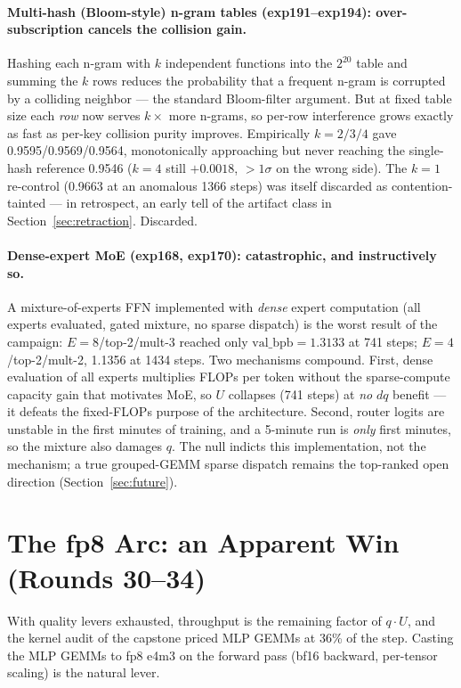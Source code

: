 \documentclass{article}
\newcommand{\valbpb}{\mathrm{val\_bpb}}
\begin{document}
\paragraph{Multi-hash (Bloom-style) n-gram tables (exp191--exp194): over-subscription cancels the collision gain.}
Hashing each n-gram with $k$ independent functions into the $2^{20}$ table and summing the $k$ rows reduces the probability that a frequent n-gram is corrupted by a colliding neighbor --- the standard Bloom-filter argument. But at fixed table size each \emph{row} now serves $k\times$ more n-grams, so per-row interference grows exactly as fast as per-key collision purity improves. Empirically $k=2/3/4$ gave 0.9595/0.9569/0.9564, monotonically approaching but never reaching the single-hash reference 0.9546 ($k=4$ still $+0.0018$, $> 1\sigma$ on the wrong side). The $k=1$ re-control (0.9663 at an anomalous 1366 steps) was itself discarded as contention-tainted --- in retrospect, an early tell of the artifact class in Section~\ref{sec:retraction}. Discarded.

\paragraph{Dense-expert MoE (exp168, exp170): catastrophic, and instructively so.}
A mixture-of-experts FFN \cite{shazeer2017outrageously} implemented with \emph{dense} expert computation (all experts evaluated, gated mixture, no sparse dispatch) is the worst result of the campaign: $E{=}8$/top-2/mult-3 reached only $\valbpb = 1.3133$ at 741 steps; $E{=}4$/top-2/mult-2, 1.1356 at 1434 steps. Two mechanisms compound. First, dense evaluation of all experts multiplies FLOPs per token without the sparse-compute capacity gain that motivates MoE, so $U$ collapses (741 steps) at \emph{no} $dq$ benefit --- it defeats the fixed-FLOPs purpose of the architecture. Second, router logits are unstable in the first minutes of training, and a 5-minute run is \emph{only} first minutes, so the mixture also damages $q$. The null indicts this implementation, not the mechanism; a true grouped-GEMM sparse dispatch remains the top-ranked open direction (Section~\ref{sec:future}).

\section{The fp8 Arc: an Apparent Win (Rounds 30--34)}
\label{sec:fp8}

With quality levers exhausted, throughput is the remaining factor of $q \cdot U$, and the kernel audit of the capstone \cite{ophis2026capstone} priced MLP GEMMs at 36\% of the step. Casting the MLP GEMMs to fp8 e4m3 on the forward pass (bf16 backward, per-tensor scaling) \cite{micikevicius2022fp8} is the natural lever.
\end{document}
